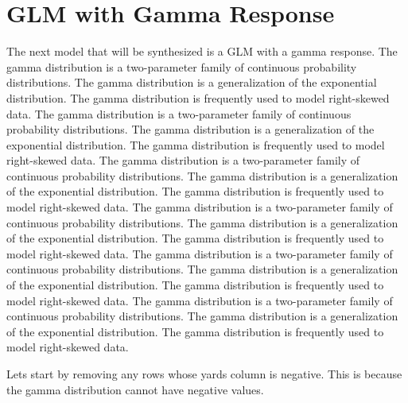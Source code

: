 \documentclass[
  super,
  preprint,
  3p]{elsarticle}
\newenvironment{Shaded}{\begin{snugshade}}{\end{snugshade}}
\newcommand{\CommentTok}[1]{\textcolor[rgb]{0.37,0.37,0.37}{#1}}
\newcommand{\DecValTok}[1]{\textcolor[rgb]{0.68,0.00,0.00}{#1}}
\newcommand{\FloatTok}[1]{\textcolor[rgb]{0.68,0.00,0.00}{#1}}
\newcommand{\NormalTok}[1]{\textcolor[rgb]{0.00,0.23,0.31}{#1}}
\newcommand{\OtherTok}[1]{\textcolor[rgb]{0.00,0.23,0.31}{#1}}
\newcommand{\SpecialCharTok}[1]{\textcolor[rgb]{0.37,0.37,0.37}{#1}}
\begin{document}
\hypertarget{glm-with-gamma-response}{%
\section{GLM with Gamma Response}\label{glm-with-gamma-response}}

The next model that will be synthesized is a GLM with a gamma response.
The gamma distribution is a two-parameter family of continuous
probability distributions. The gamma distribution is a generalization of
the exponential distribution. The gamma distribution is frequently used
to model right-skewed data. The gamma distribution is a two-parameter
family of continuous probability distributions. The gamma distribution
is a generalization of the exponential distribution. The gamma
distribution is frequently used to model right-skewed data. The gamma
distribution is a two-parameter family of continuous probability
distributions. The gamma distribution is a generalization of the
exponential distribution. The gamma distribution is frequently used to
model right-skewed data. The gamma distribution is a two-parameter
family of continuous probability distributions. The gamma distribution
is a generalization of the exponential distribution. The gamma
distribution is frequently used to model right-skewed data. The gamma
distribution is a two-parameter family of continuous probability
distributions. The gamma distribution is a generalization of the
exponential distribution. The gamma distribution is frequently used to
model right-skewed data. The gamma distribution is a two-parameter
family of continuous probability distributions. The gamma distribution
is a generalization of the exponential distribution. The gamma
distribution is frequently used to model right-skewed data.

Lets start by removing any rows whose yards column is negative. This is
because the gamma distribution cannot have negative values.

\begin{Shaded}
\end{Shaded}
\end{document}
